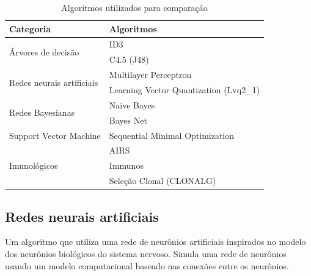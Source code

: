 \vspace{0.5cm}
\begin{table}[h]
    \centering
    \caption{Algoritmos utilizados para comparação}
    \label{tbl:dev_algs}
    \vspace{0.5cm}
    \begin{tabular}{|l|l|}
        \hline
        \textbf{Categoria}                         & \textbf{Algoritmos}                    \\
        \hline
        \multirow{2}{*}{Árvores de decisão}        & ID3                                    \\ \cline{2-2}
                                                   & C4.5 (J48)                             \\
        \hline
        \multirow{2}{*}{Redes neurais artificiais} & Multilayer Perceptron                  \\ \cline{2-2}
                                                   & Learning Vector Quantization (Lvq2\_1) \\
        \hline
        \multirow{2}{*}{Redes Bayesianas}          & Naive Bayes                            \\ \cline{2-2}
                                                   & Bayes Net                              \\
        \hline
        Support Vector Machine                     & Sequential Minimal Optimization        \\
        \hline
        \multirow{3}{*}{Imunológicos}              & AIRS                                   \\ \cline{2-2}
                                                   & Immunos                                \\ \cline{2-2}
                                                   & Seleção Clonal (CLONALG)               \\
        \hline
    \end{tabular}
\end{table}
\vspace{0.5cm}

\subsection{Redes neurais artificiais}

Um algoritmo que utiliza uma rede de neurônios artificiais inspirados no modelo dos neurônios biológicos do sistema nervoso. Simula uma rede de neurônios usando um modelo computacional baseado nas conexões entre os neurônios.

